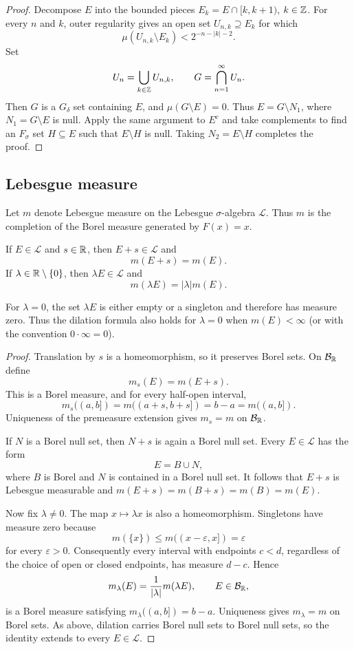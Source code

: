 \begin{proof}
  Decompose $E$ into the bounded pieces
  $E_k=E\cap[k,k+1)$, $k\in\mathbb{Z}$. For every $n$ and $k$, outer
  regularity gives an open set $U_{n,k}\supseteq E_k$ for which
  \[
    \mu(U_{n,k}\setminus E_k)<2^{-n-|k|-2}.
  \]
  Set
  \[
    U_n=\bigcup_{k\in\mathbb{Z}}U_{n,k},
    \qquad
    G=\bigcap_{n=1}^{\infty}U_n.
  \]
  Then $G$ is a $G_\delta$ set containing $E$, and
  $\mu(G\setminus E)=0$. Thus $E=G\setminus N_1$, where
  $N_1=G\setminus E$ is null. Apply the same argument to $E^c$ and
  take complements to find an $F_\sigma$ set $H\subseteq E$ such that
  $E\setminus H$ is null. Taking $N_2=E\setminus H$ completes the
  proof.
\end{proof}

\subsection{Lebesgue measure}

Let $m$ denote Lebesgue measure on the Lebesgue $\sigma$-algebra
$\mathcal L$. Thus $m$ is the completion of the Borel measure generated
by $F(x)=x$.

\begin{theorem}
  \label{thm:lebesgue-invariance-sep-10}
  If $E\in\mathcal L$ and $s\in\mathbb{R}$, then $E+s\in\mathcal L$ and
  \[
    m(E+s)=m(E).
  \]
  If $\lambda\in\mathbb{R}\setminus\{0\}$, then
  $\lambda E\in\mathcal L$ and
  \[
    m(\lambda E)=|\lambda|m(E).
  \]
\end{theorem}

For $\lambda=0$, the set $\lambda E$ is either empty or a singleton and
therefore has measure zero. Thus the dilation formula also holds for
$\lambda=0$ when $m(E)<\infty$ (or with the convention $0\cdot\infty=0$).

\begin{proof}
  Translation by $s$ is a homeomorphism, so it preserves Borel sets.
  On $\mathcal B_{\mathbb{R}}$ define
  \[
    m_s(E)=m(E+s).
  \]
  This is a Borel measure, and for every half-open interval,
  \[
    m_s((a,b])=m((a+s,b+s])=b-a=m((a,b]).
  \]
  Uniqueness of the premeasure extension gives $m_s=m$ on
  $\mathcal B_{\mathbb{R}}$.

  If $N$ is a Borel null set, then $N+s$ is again a Borel null set.
  Every $E\in\mathcal L$ has the form
  \[
    E=B\cup N,
  \]
  where $B$ is Borel and $N$ is contained in a Borel null set. It
  follows that $E+s$ is Lebesgue measurable and
  $m(E+s)=m(B+s)=m(B)=m(E)$.

  Now fix $\lambda\neq0$. The map $x\mapsto\lambda x$ is also a
  homeomorphism. Singletons have measure zero because
  \[
    m(\{x\})\leq m((x-\varepsilon,x])=\varepsilon
  \]
  for every $\varepsilon>0$. Consequently every interval with endpoints
  $c<d$, regardless of the choice of open or closed endpoints, has
  measure $d-c$. Hence
  \[
    m_\lambda(E)=\frac{1}{|\lambda|}m(\lambda E),
    \qquad E\in\mathcal B_{\mathbb{R}},
  \]
  is a Borel measure satisfying
  $m_\lambda((a,b])=b-a$. Uniqueness gives $m_\lambda=m$ on Borel
  sets. As above, dilation carries Borel null sets to Borel null sets,
  so the identity extends to every $E\in\mathcal L$.
\end{proof}


